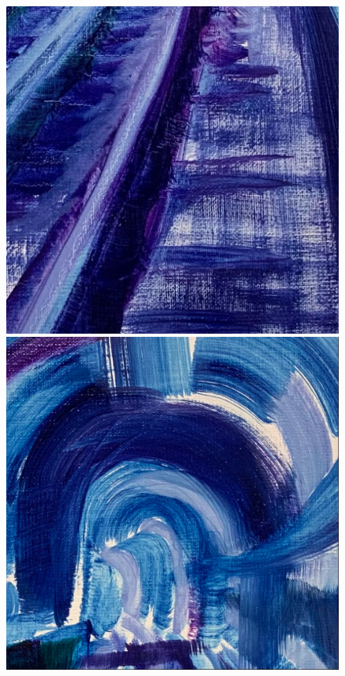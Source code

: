 \begin{figure}
\begin{minipage}{.91\linewidth}
\begin{minipage}{.3\linewidth}
	\includegraphics[width = \linewidth]{apendice/pinturas-finalizadas/boudet-profundidade-campo-i-detalhe1.pdf}
\end{minipage}
\hfill
\begin{minipage}{.3\linewidth}
	\includegraphics[width = \linewidth]{apendice/pinturas-finalizadas/boudet-profundidade-campo-i-detalhe2.pdf}

\end{minipage}
\end{minipage}
\end{figure}
